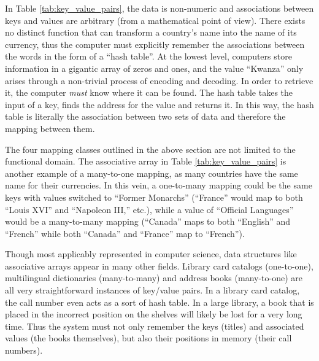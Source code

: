 In Table \ref{tab:key_value_pairs}, the data is non-numeric and associations between keys and values are arbitrary (from a mathematical point of view). There exists no distinct function that can transform a country's name into the name of its currency, thus the computer must explicitly remember the associations between the words in the form of a ``hash table''. 
At the lowest level, computers store information in a gigantic array of zeros and ones, and the value ``Kwanza'' only arises through a non-trivial process of encoding and decoding. In order to retrieve it, the computer \emph{must} know where it can be found. The hash table takes the input of a key, finds the address for the value and returns it. In this way, the hash table is literally the association between two sets of data and therefore the mapping between them. 

The four mapping classes outlined in the above section are not limited to the functional domain. The associative array in Table \ref{tab:key_value_pairs} is another example of a many-to-one mapping, as many countries have the same name for their currencies. In this vein, a one-to-many mapping could be the same keys with values switched to ``Former Monarchs'' (``France'' would map to both ``Louis XVI'' and ``Napoleon III,'' etc.), while a value of ``Official Languages'' would be a many-to-many mapping (``Canada'' maps to both ``English'' and ``French'' while both ``Canada'' and ``France'' map to ``French'').

Though most applicably represented in computer science, data structures like associative arrays appear in many other fields. Library card catalogs (one-to-one), multilingual dictionaries (many-to-many) and address books (many-to-one) are all very straightforward instances of key/value pairs. In a library card catalog, the call number even acts as a sort of hash table. In a large library, a book that is placed in the incorrect position on the shelves will likely be lost for a very long time. Thus the system must not only remember the keys (titles) and associated values (the books themselves), but also their positions in memory (their call numbers).


